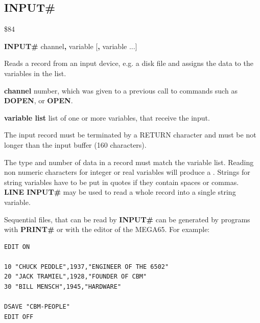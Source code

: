
\newpage
\subsection{INPUT\#}
\begin{description}[leftmargin=2cm,style=nextline]
\item [Token:] \$84
\item [Format:] {\bf INPUT\#} channel{\bf,} variable [{\bf,} variable ...]
\item [Usage:] Reads a record
               from an input device, e.g. a disk file
               and assigns the data
               to the variables in the list.

               {\bf channel} number, which was given to a previous
               call to commands such as {\bf DOPEN}, or {\bf OPEN}.


               {\bf variable list} list of one or more
               variables, that receive the input.

               The input record must be terminated by a
               RETURN character and must be not longer than
               the input buffer (160 characters).

\item [Remarks:] The type and number of data in a record must
               match the variable list.
               Reading non numeric characters for integer or real
               variables will produce a .
               Strings for string variables have to be put in quotes
               if they contain spaces or commas. \\
               {\bf LINE INPUT\#} may be used to
               read a whole record into a single string variable.

               Sequential files, that can be read by {\bf INPUT\#}
               can be generated by programs with {\bf PRINT\#}
               or with the editor of the MEGA65.
               For example:

\begin{tcolorbox}[colback=black,coltext=white]
\verbatimfont{\codefont}
\begin{verbatim}
EDIT ON

10 "CHUCK PEDDLE",1937,"ENGINEER OF THE 6502"
20 "JACK TRAMIEL",1928,"FOUNDER OF CBM"
30 "BILL MENSCH",1945,"HARDWARE"

DSAVE "CBM-PEOPLE"
EDIT OFF
\end{verbatim}
\end{tcolorbox}


\end{description}
